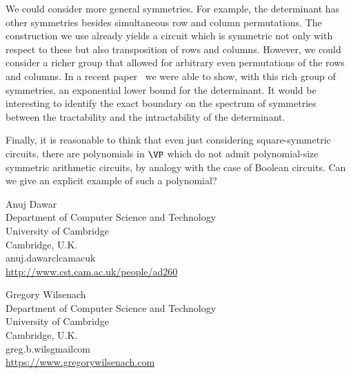 \documentclass{toc}
\begin{document}
We could consider more general symmetries. For example, the determinant has
other symmetries besides simultaneous row and column permutations. The
construction we use already yields a circuit which is symmetric not only with
respect to these but also transposition of rows and columns.  However, we could
consider a richer group that allowed for arbitrary even permutations of the rows
and columns.  %
In a recent paper~\cite{DWitcs22}  %
we %
were %
able to show, with this rich
group of symmetries, an exponential lower bound for the determinant.  It would be interesting to identify the exact boundary on the spectrum of symmetries between the tractability and the intractability of the determinant.

Finally, it is reasonable to think that even just considering
square-symmetric %
circuits, there are polynomials in $\VP$ which do
not admit polynomial-size symmetric arithmetic circuits, by analogy with the
case of Boolean circuits.  Can we give an explicit example of such a polynomial?


%
%
%
%


%
%
%
%
%
\begin{tocauthors}
\begin{tocinfo}[dawar]
 Anuj Dawar\\
  Department of Computer Science and Technology \\
 University of Cambridge\\
Cambridge, U.K.\\
anuj.dawar\tocat{}cl\tocdot{}cam\tocdot{}ac\tocdot{}uk \\   %
 \url{http://www.cst.cam.ac.uk/people/ad260}      %
\end{tocinfo}
\begin{tocinfo}[wilsenach]
 Gregory Wilsenach\\
 Department of Computer Science and Technology \\
 University of Cambridge\\
 Cambridge, U.K.\\
 greg.b.wils\tocat{}gmail\tocdot{}com\\ %
  \url{https://www.gregorywilsenach.com}
\end{tocinfo}
\end{tocauthors}
\end{document}
